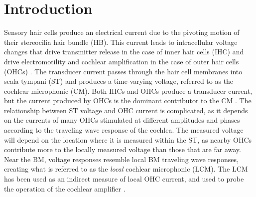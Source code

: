 \documentclass{biophys-new}
\begin{document}
\section{Introduction}
\par{Sensory hair cells produce an electrical current due to the pivoting motion of their stereocilia hair bundle (HB). This current leads to intracellular voltage changes that drive transmitter release in the case of inner hair cells (IHC) and drive electromotility and cochlear amplification in the case of outer hair cells (OHCs) \cite{olson2020}.  The  transducer current passes through the hair cell membranes into scala tympani (ST) and produces a time-varying voltage, referred to as the cochlear microphonic (CM). Both IHCs and OHCs produce a transducer current, but the current produced by OHCs is the dominant contributor to the CM  \cite{dallos2}. The relationship between ST voltage and OHC current is complicated, as it depends on the currents of many OHCs stimulated at different amplitudes and phases according to the traveling wave response of the cochlea. The measured voltage will depend on the location where it is measured within the ST, as nearby OHCs contribute more to the locally measured voltage than those that are far away. Near the BM, voltage responses resemble local BM traveling wave responses, creating what is referred to as the \textit{local} cochlear microphonic (LCM). The LCM has been used as an indirect measure of local OHC current, and used to probe the operation of the cochlear amplifier \cite{dongolson,wang,charaziak,fridberger}.  }
\end{document}
